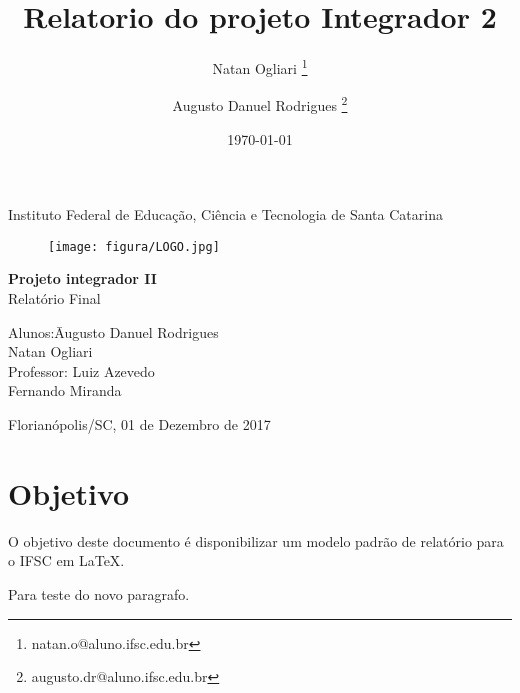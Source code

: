\documentclass[a4paper, 12pt]{article}
\title{Relatorio do projeto Integrador 2} %
\author{Natan Ogliari \thanks{natan.o@aluno.ifsc.edu.br} \and Augusto Danuel Rodrigues \thanks{augusto.dr@aluno.ifsc.edu.br}} %
\date{\today}
\begin{document}

\begin{titlepage}
	\begin{center} %
		\huge{Instituto Federal de Educação, Ciência e Tecnologia de Santa Catarina}

\vspace{10pt}
\begin{figure}[!ht]
\centering
\texttt{[image: figura/LOGO.jpg]} %
\end{figure}

        \vspace{85pt}

		\textbf{\LARGE{Projeto integrador II}}\\
		\large{Relatório Final}
		\vspace{160pt}

	\end{center}

	\begin{flushleft}
		\begin{tabbing}
			Alunos:\qquad\qquad\= Augusto Danuel Rodrigues\\
			\>Natan Ogliari\\

			Professor:\> Luiz Azevedo \\
					  \> Fernando Miranda \\

	\end{tabbing}

	\end{flushleft}

	\begin{center}
		\vspace{\fill}
		Florianópolis/SC, 01 de Dezembro de 2017
	\end{center}
\end{titlepage}
\newpage
\tableofcontents
\thispagestyle{empty}

\newpage
{}
\section{Objetivo}
O objetivo deste documento é disponibilizar um modelo padrão de relatório para o IFSC em \LaTeX.
\par Para teste do novo paragrafo.
\end{document}
